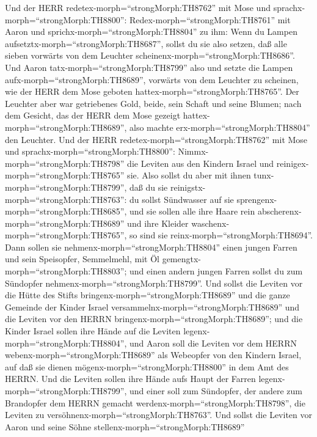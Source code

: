  Und der HERR redetex-morph=``strongMorph:TH8762'' mit Mose
und sprachx-morph=``strongMorph:TH8800'': 
Redex-morph=``strongMorph:TH8761'' mit Aaron und
sprichx-morph=``strongMorph:TH8804'' zu ihm: Wenn du Lampen
aufsetztx-morph=``strongMorph:TH8687'', sollst du sie also setzen, daß
alle sieben vorwärts von dem Leuchter
scheinenx-morph=``strongMorph:TH8686''.  Und Aaron
tatx-morph=``strongMorph:TH8799'' also und setzte die Lampen
aufx-morph=``strongMorph:TH8689'', vorwärts von dem Leuchter zu
scheinen, wie der HERR dem Mose geboten
hattex-morph=``strongMorph:TH8765''.  Der Leuchter aber war
getriebenes Gold, beide, sein Schaft und seine Blumen; nach dem Gesicht,
das der HERR dem Mose gezeigt hattex-morph=``strongMorph:TH8689'', also
machte erx-morph=``strongMorph:TH8804'' den Leuchter.  Und
der HERR redetex-morph=``strongMorph:TH8762'' mit Mose und
sprachx-morph=``strongMorph:TH8800'': 
Nimmx-morph=``strongMorph:TH8798'' die Leviten aus den Kindern Israel
und reinigex-morph=``strongMorph:TH8765'' sie.  Also sollst
du aber mit ihnen tunx-morph=``strongMorph:TH8799'', daß du sie
reinigstx-morph=``strongMorph:TH8763'': du sollst Sündwasser auf sie
sprengenx-morph=``strongMorph:TH8685'', und sie sollen alle ihre Haare
rein abscherenx-morph=``strongMorph:TH8689'' und ihre Kleider
waschenx-morph=``strongMorph:TH8765'', so sind sie
reinx-morph=``strongMorph:TH8694''.  Dann sollen sie
nehmenx-morph=``strongMorph:TH8804'' einen jungen Farren und sein
Speisopfer, Semmelmehl, mit Öl gemengtx-morph=``strongMorph:TH8803'';
und einen andern jungen Farren sollst du zum Sündopfer
nehmenx-morph=``strongMorph:TH8799''.  Und sollst die
Leviten vor die Hütte des Stifts bringenx-morph=``strongMorph:TH8689''
und die ganze Gemeinde der Kinder Israel
versammelnx-morph=``strongMorph:TH8689''  und die Leviten
vor den HERRN bringenx-morph=``strongMorph:TH8689''; und die Kinder
Israel sollen ihre Hände auf die Leviten
legenx-morph=``strongMorph:TH8804'',  und Aaron soll die
Leviten vor dem HERRN webenx-morph=``strongMorph:TH8689'' als Webeopfer
von den Kindern Israel, auf daß sie dienen
mögenx-morph=``strongMorph:TH8800'' in dem Amt des HERRN. 
Und die Leviten sollen ihre Hände aufs Haupt der Farren
legenx-morph=``strongMorph:TH8799'', und einer soll zum Sündopfer, der
andere zum Brandopfer dem HERRN gemacht
werdenx-morph=``strongMorph:TH8798'', die Leviten zu
versöhnenx-morph=``strongMorph:TH8763''.  Und sollst die
Leviten vor Aaron und seine Söhne stellenx-morph=``strongMorph:TH8689''
